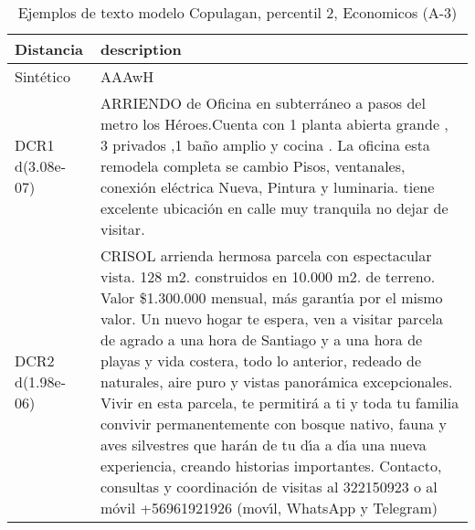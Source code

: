\begin{table}[H]
\centering
\fontsize{10}{14}\selectfont
\caption{Ejemplos de texto modelo Copulagan, percentil 2, Economicos (A-3)}
\label{table-example-economicos-a-3-copulagan-2p-text}
\begin{tabular}{|l|m{35em}|}
\hline
\rowcolor[gray]{0.8}
Distancia & description \\
\hline Sintético & AAAwH \\
\hline DCR1 d(3.08e-07) & ARRIENDO de Oficina en subterr\'aneo a pasos del metro los H\'eroes.Cuenta con 1 planta abierta grande , 3 privados ,1 ba\~no amplio y cocina . La oficina esta remodela completa se cambio Pisos, ventanales, conexi\'on el\'ectrica Nueva, Pintura y luminaria. tiene excelente ubicaci\'on en calle muy tranquila no dejar de visitar. \\
\hline DCR2 d(1.98e-06) & CRISOL arrienda hermosa parcela con espectacular vista. 128 m2. construidos en 10.000 m2. de terreno. Valor \$1.300.000 mensual, m\'as garant{\'\i}a por el mismo valor. Un nuevo hogar te espera, ven a visitar parcela de agrado a una hora de Santiago y a una hora de playas y vida costera, todo lo anterior, redeado de naturales, aire puro y vistas panor\'amica excepcionales. Vivir en esta parcela, te permitir\'a a ti y toda tu familia convivir permanentemente con bosque nativo, fauna y aves silvestres que har\'an de tu d{\'\i}a a d{\'\i}a una nueva experiencia, creando historias importantes. Contacto, consultas y coordinaci\'on de visitas al 322150923 o al m\'ovil +56961921926 (mov{\'\i}l, WhatsApp y Telegram) \\
\hline
\end{tabular}
\end{table}
